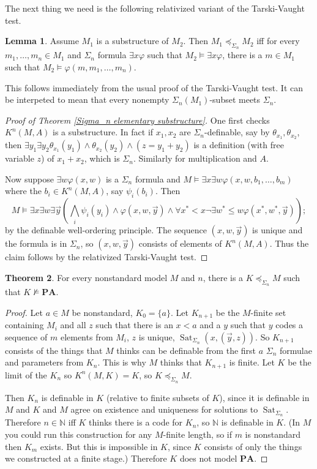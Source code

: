 \documentclass[12pt]{report}
\newcommand{\NN}{\mathbb{N}}
\newcommand{\PA}{\mathbf{PA}}
\DeclareMathOperator{\Sat}{Sat}
\theoremstyle{definition}
\newtheorem{theorem}{Theorem}[chapter]
\newtheorem{lemma}[theorem]{Lemma}
\begin{document}
The next thing we need is the following relativized variant of the Tarski-Vaught test.
\begin{lemma}
Assume $M_1$ is a substructure of $M_2$. Then $M_1 \preceq_{\Sigma_n} M_2$ iff for every $m_1, \dots, m_n \in M_1$ and $\Sigma_n$ formula $\exists x \varphi$ such that $M_2 \models \exists x \varphi$, there is a $m \in M_1$ such that $M_2 \models \varphi(m, m_1, \dots, m_n)$.
\end{lemma}
This follows immediately from the usual proof of the Tarski-Vaught test. It can be interpeted to mean that every nonempty $\Sigma_n(M_1)$-subset meets $\Sigma_n$.

\begin{proof}[Proof of Theorem \ref{Sigma_n elementary substructure}]
One first checks $K^n(M, A)$ is a substructure. In fact if $x_1, x_2$ are $\Sigma_n$-definable, say by $\theta_{x_1}, \theta_{x_2}$, then $\exists y_1 \exists y_2 \theta_{x_1}(y_1)\wedge\theta_{x_2}(y_2)\wedge (z=y_1+y_2)$ is a definition (with free variable $z$) of $x_1 + x_2$, which is $\Sigma_n$. Similarly for multiplication and $A$.

Now suppose $\exists w\varphi(x, w)$ is a $\Sigma_n$ formula and $M \models \exists x \exists w\varphi(x, w, b_1, \dots, b_m)$ where the $b_i \in K^n(M, A)$, say $\psi_i(b_i)$. Then
$$M \models \exists x \exists w \exists \vec y(\bigwedge_i \psi_i(y_i) \wedge \varphi(x, w, \vec y) \wedge \forall x^*<x \neg \exists w^*\leq w\varphi(x^*, w^*, \vec y));$$
by the definable well-ordering principle. The sequence $(x, w, \vec y)$ is unique and the formula is in $\Sigma_n$, so $(x, w, \vec y)$ consists of elements of $K^n(M, A)$. Thus the claim follows by the relativized Tarski-Vaught test.
\end{proof}

\begin{theorem}
For every nonstandard model $M$ and $n$, there is a $K \preceq_{\Sigma_n} M$ such that $K \not\models \PA$.
\end{theorem}
\begin{proof}
Let $a \in M$ be nonstandard, $K_0 = \{a\}$. Let $K_{n+1}$ be the $M$-finite set containing $M_i$ and all $z$ such that there is an $x < a$ and a $y$ such that $y$ codes a sequence of $m$ elements from $M_i$, $z$ is unique, $\Sat_{\Sigma_n}(x, (\vec y, z))$.
So $K_{n+1}$ consists of the things that $M$ thinks can be definable from the first $a$ $\Sigma_n$ formulae and parameters from $K_n$.
This is why $M$ thinks that $K_{n+1}$ is finite.
Let $K$ be the limit of the $K_n$ so $K^n(M, K) = K$, so $K \preceq_{\Sigma_n} M$.

Then $K_n$ is definable in $K$ (relative to finite subsets of $K$), since it is definable in $M$ and $K$ and $M$ agree on existence and uniqueness for solutions to $\Sat_{\Sigma_n}$.
Therefore $n \in \NN$ iff $K$ thinks there is a code for $K_n$, so $\NN$ is definable in $K$. (In $M$ you could run this construction for any $M$-finite length, so if $m$ is nonstandard then $K_m$ exists. But this is impossible in $K$, since $K$ consists of only the things we constructed at a finite stage.)
Therefore $K$ does not model $\PA$.
\end{proof}
\end{document}
